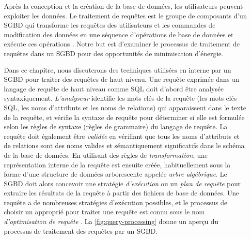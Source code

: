 

Après la conception et la création de la base de données, les utilisateurs peuvent exploiter les données. Le traitement de requêtes est le groupe de composants d’un SGBD qui transforme les requêtes des utilisateurs et les commandes de modification des données en une séquence d’opérations de base de données et exécute ces opérations \cite{GarciaMolina08}. Notre but est d'examiner le processus de traitement de requêtes dans un SGBD pour des opportunités de minimisation d'énergie.

Dans ce chapitre, nous discuterons des techniques utilisées en interne par un SGBD pour traiter des requêtes de haut niveau. Une requête exprimée dans un langage de requête de haut niveau comme SQL doit d'abord être analysée syntaxiquement. \textit{L'analyseur} identifie les mots clés de la requête (les mots clés SQL, les noms d'attributs et les noms de relations) qui apparaissent dans le texte de la requête, et vérifie la syntaxe de requête pour déterminer si elle est formulée selon les règles de syntaxe (règles de grammaire) du langage de requête. La requête doit également être \textit{validée} en vérifiant que tous les noms d'attributs et de relations sont des noms valides et sémantiquement significatifs dans le schéma de la base de données. En utilisant des règles de \textit{transformation}, une représentation interne de la requête est ensuite créée, habituellement sous la forme d'une structure de données arborescente appelée \textit{arbre algébrique}. Le SGBD doit alors concevoir une stratégie \textit{d'exécution} ou un \textit{plan de requête} pour extraire les résultats de la requête à partir des fichiers de base de données. Une requête a de nombreuses stratégies d'exécution possibles, et le processus de choisir un approprié pour traiter une requête est connu sous le nom \textit{d'optimisation de requête} \cite{Elmasri08}. La \ref{fig:query-processing} donne un aperçu du processus de traitement des requêtes par un SGBD.


